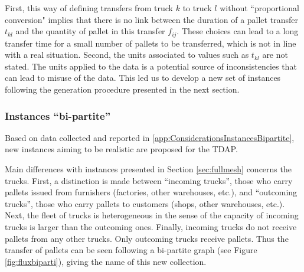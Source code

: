\documentclass[preprint,12pt,authoryear]{elsarticle}
\begin{document}
First, this way of defining transfers from truck $k$ to truck $l$ without ``proportional conversion" implies that there is no link between the duration of a pallet transfer $t_{kl}$ and the quantity of pallet in this transfer $f_{ij}$. These choices can lead to a long transfer time for a small number of pallets to be transferred, which is not in line with a real situation.
%
Second,  the units associated to values such as $t_{kl}$ are not stated.
The units applied to the data is a potential source of inconsistencies that can lead to misuse of the data.  
%
This led us to develop a new set of instances following the generation procedure presented in the next section.


%
%
\subsubsection{Instances ``bi-partite''}\label{sec:bipartite}

Based on  data collected and reported in \ref{app:ConsiderationsInstancesBipartite}, 
new  instances aiming to be realistic are proposed for the TDAP.
 

Main differences with instances presented in Section \ref{sec:fullmesh} concerns the trucks.
%
First, a distinction is made between 
``incoming trucks'', those who carry pallets issued from furnishers (factories, other warehouses, etc.), and 
``outcoming trucks'', those who carry pallets to customers (shops, other warehouses, etc.).
%
Next, the fleet of trucks is heterogeneous in the sense of the capacity of incoming trucks is larger than the outcoming ones. 
%
Finally, incoming trucks do not receive pallets from any other trucks. Only outcoming trucks receive pallets. Thus the transfer of pallets can be seen following a bi-partite graph (see Figure \ref{fig:fluxbiparti}), giving the name of this new collection. 
\end{document}

